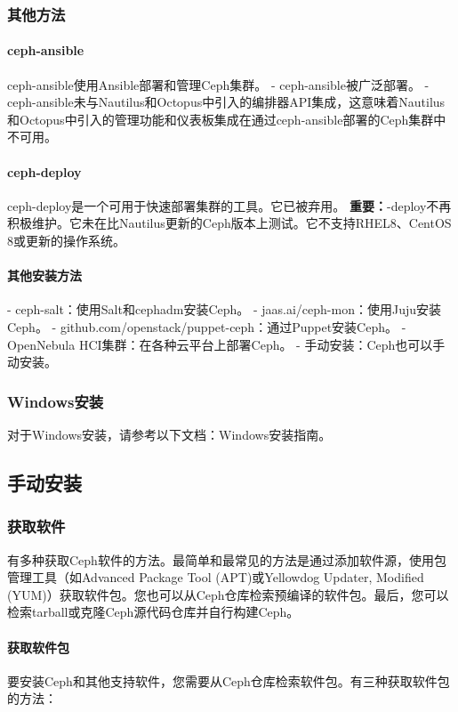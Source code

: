 \documentclass[12pt,UTF8]{ctexbook}
\begin{document}
\subsubsection{其他方法}
\paragraph{ceph-ansible}
ceph-ansible使用Ansible部署和管理Ceph集群。
- ceph-ansible被广泛部署。
- ceph-ansible未与Nautilus和Octopus中引入的编排器API集成，这意味着Nautilus和Octopus中引入的管理功能和仪表板集成在通过ceph-ansible部署的Ceph集群中不可用。

\paragraph{ceph-deploy}
ceph-deploy是一个可用于快速部署集群的工具。它已被弃用。
\textbf{重要：}\nceph-deploy不再积极维护。它未在比Nautilus更新的Ceph版本上测试。它不支持RHEL8、CentOS 8或更新的操作系统。

\paragraph{其他安装方法}
- ceph-salt：使用Salt和cephadm安装Ceph。
- jaas.ai/ceph-mon：使用Juju安装Ceph。
- github.com/openstack/puppet-ceph：通过Puppet安装Ceph。
- OpenNebula HCI集群：在各种云平台上部署Ceph。
- 手动安装：Ceph也可以手动安装。

\subsubsection{Windows安装}
对于Windows安装，请参考以下文档：Windows安装指南。

\subsection{手动安装}

\subsubsection{获取软件}
有多种获取Ceph软件的方法。最简单和最常见的方法是通过添加软件源，使用包管理工具（如Advanced Package Tool (APT)或Yellowdog Updater, Modified (YUM)）获取软件包。您也可以从Ceph仓库检索预编译的软件包。最后，您可以检索tarball或克隆Ceph源代码仓库并自行构建Ceph。

\paragraph{获取软件包}
要安装Ceph和其他支持软件，您需要从Ceph仓库检索软件包。有三种获取软件包的方法：
\end{document}
